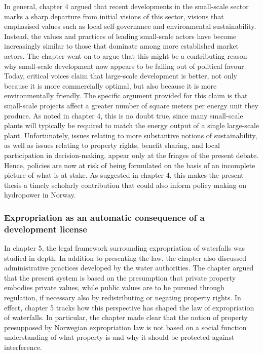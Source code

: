 In general, chapter 4 argued that recent developments in the small-scale sector marks a sharp departure from initial visions of this sector, visions that emphasised values such as local self-governance and environmental sustainability. Instead, the values and practices of leading small-scale actors have become increasingly similar to those that dominate among more established market actors. The chapter went on to argue that this might be a contributing reason why small-scale development now appears to be falling out of political favour. Today, critical voices claim that large-scale development is better, not only because it is more commercially optimal, but also because it is more environmentally friendly. The specific argument provided for this claim is that small-scale projects affect a greater number of square meters per energy unit they produce. As noted in chapter 4, this is no doubt true, since many small-scale plants will typically be required to match the energy output of a single large-scale plant. Unfortunately, issues relating to more substantive notions of sustainability, as well as issues relating to property rights, benefit sharing, and local participation in decision-making, appear only at the fringes of the present debate. Hence, policies are now at risk of being formulated on the basis of an incomplete picture of what is at stake. As suggested in chapter 4, this makes the present thesis a timely scholarly contribution that could also inform policy making on hydropower in Norway.

\subsubsection*{Expropriation as an automatic consequence of a development license}

In chapter 5, the legal framework surrounding expropriation of waterfalls was studied in depth. In addition to presenting the law, the chapter also discussed administrative practices developed by the water authorities. The chapter argued that the present system is based on the presumption that private property embodies private values, while public values are to be pursued through regulation, if necessary also by redistributing or negating property rights. In effect, chapter 5 tracks how this perspective has shaped the law of expropriation of waterfalls. In particular, the chapter made clear that the notion of property presupposed by Norwegian expropriation law is not based on a social function understanding of what property is and why it should be protected against interference. 

